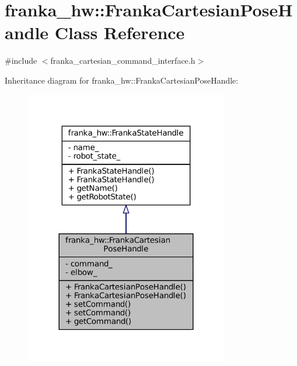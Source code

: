 \hypertarget{classfranka__hw_1_1FrankaCartesianPoseHandle}{}\section{franka\+\_\+hw\+:\+:Franka\+Cartesian\+Pose\+Handle Class Reference}
\label{classfranka__hw_1_1FrankaCartesianPoseHandle}


{\ttfamily \#include $<$franka\+\_\+cartesian\+\_\+command\+\_\+interface.\+h$>$}



Inheritance diagram for franka\+\_\+hw\+:\+:Franka\+Cartesian\+Pose\+Handle\+:
\nopagebreak
\begin{figure}[H]
\begin{center}
\leavevmode
\includegraphics[width=252pt]{classfranka__hw_1_1FrankaCartesianPoseHandle__inherit__graph}
\end{center}
\end{figure}


